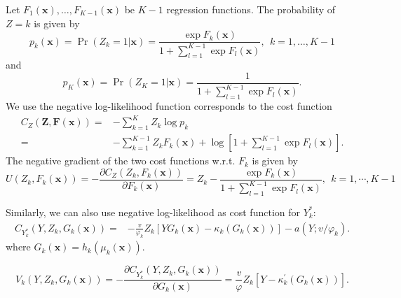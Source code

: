 \documentclass[11pt]{article}
\numberwithin{equation}{section}
\def\bx{\boldsymbol{x}}
\begin{document}
Let $F_1(\bx),\ldots,F_{K-1}(\bx)$ be $K-1$ regression functions. The probability of $Z=k$ is given by
\begin{equation}
	p_k(\bx)=\Pr(Z_k=1|\bx)=\frac{\exp{F_k(\bx)}}{1+\sum_{l=1}^{K-1}\exp{F_l(\bx)}}, ~~k=1,\ldots,K-1
\end{equation}
and
\begin{equation}
	p_K(\bx)=\Pr(Z_K=1|\bx)=\frac{1}{1+\sum_{l=1}^{K-1}\exp{F_l(\bx)}}.
\end{equation}
We use the negative log-likelihood function corresponds to the cost function 
\begin{equation}
	\begin{aligned}
		    C_{Z}(\boldsymbol{Z}, \boldsymbol{F}(\bx))=& - \sum_{k=1}^K Z_k \log p_k\\
		    =& -\sum_{k=1}^{K-1}  Z_k F_k(\bx)  + \log[1+ \sum_{l=1}^{K-1}\exp{F_l(\bx)}].
	\end{aligned}
\end{equation}
The negative gradient of the two cost functions w.r.t. $F_k$ is given by
\begin{equation}
	U(Z_k,F_k(\bx))=-\frac{\partial C_{Z}(Z_k,F_k(\bx))}{\partial F_k(\bx)}=
	Z_k-\frac{\exp F_k(\bx)}{1+ \sum_{l=1}^{K-1}\exp{F_l(\bx)}}, ~~k=1,\cdots,K-1
\end{equation}

Similarly, we can also use negative log-likelihood as cost function for $Y_{k}^*$:
\begin{equation}
	\begin{aligned}
		C_{Y_k^*}(Y,Z_k,G_k(\bx))=& -\frac{v}{\varphi_k}Z_k\left[Y G_k(\bx)-\kappa_k\left(G_k(\bx)\right)\right]-a\left(Y ; v / \varphi_k\right).
	\end{aligned}
\end{equation}
where $G_k(\bx)=h_k(\mu_k(\bx))$.

\begin{equation}
	V_k(Y,Z_k,G_k(\bx))=-\frac{\partial C_{Y_k^*}(Y,Z_k,G_k(\bx))}{\partial G_k(\bx)}=
	\frac{v}{\varphi}Z_k\left[Y -\kappa_k^{\prime}\left(G_k(\bx)\right)\right].
\end{equation}
\end{document}
